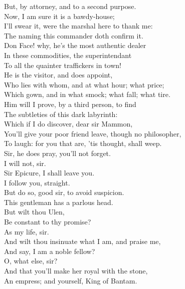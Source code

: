 \documentclass{memoir}
\begin{document}
\begin{drama*}
 But, by attorney, and to a second purpose.\\
 Now, I am sure it is a bawdy-house;\\
 I'll swear it, were the marshal here to thank me:\\
 The naming this commander doth confirm it.\\
 Don Face! why, he's the most authentic dealer\\
 In these commodities, the superintendant\\
 To all the quainter traffickers in town!\\
 He is the visitor, and does appoint,\\
 Who lies with whom, and at what hour; what price;\\
 Which gown, and in what smock; what fall; what tire.\\
 Him will I prove, by a third person, to find\\
 The subtleties of this dark labyrinth:\\
 Which if I do discover, dear sir Mammon,\\
 You'll give your poor friend leave, though no philosopher,\\
 To laugh: for you that are, 'tis thought, shall weep.\\
\facespeaks  Sir, he does pray, you'll not forget.\\
\surlyspeaks {} I will not, sir.\\
 Sir Epicure, I shall leave you.\\
\mammonspeaks {} I follow you, straight.\\
\facespeaks  But do so, good sir, to avoid suspicion.\\
 This gentleman has a parlous head.\\
\mammonspeaks  But wilt thou Ulen,\\
 Be constant to thy promise?\\
\facespeaks {} As my life, sir.\\
\mammonspeaks  And wilt thou insinuate what I am, and praise me,\\
 And say, I am a noble fellow?\\
\facespeaks {} O, what else, sir?\\
 And that you'll make her royal with the stone,\\
 An empress; and yourself, King of Bantam.\\

\end{drama*}
\end{document}
